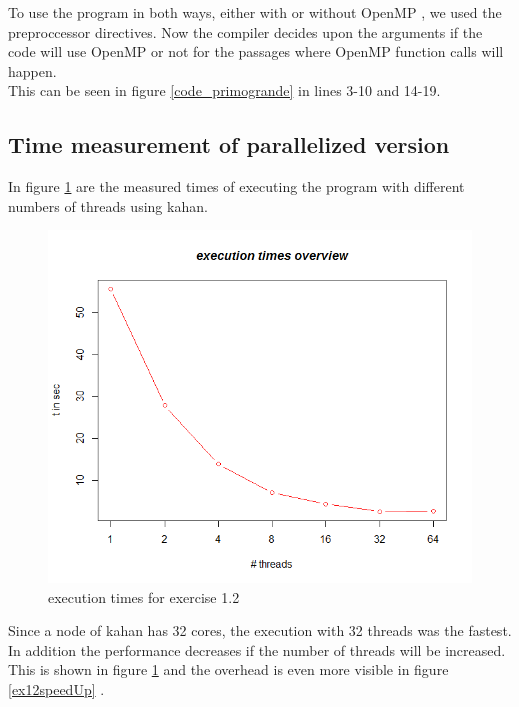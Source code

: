 \documentclass[11pt,a4paper]{article}
\begin{document}
To use the program in both ways, either with or without OpenMP , we used the preproccessor directives. Now the compiler decides upon the arguments if the code will use OpenMP or not for the passages where OpenMP function calls will happen.\\

This can be seen in figure \ref{code_primogrande} in lines 3-10 and 14-19.

\pagebreak
\subsection{Time measurement of parallelized version}

In figure \ref{ex12execution} are the measured times of executing the program with different numbers of threads using kahan.\\

\begin{figure}[h]
\centering
  \includegraphics[scale=0.35]{statistics/Ex12ResultGraph.png}
	\caption{execution times for exercise 1.2}
	\label{ex12execution}
\end{figure}


Since a node of kahan has 32 cores, the execution with 32 threads was the fastest. In addition the performance decreases if the number of threads will be increased. This is shown in figure \ref{ex12execution} and the overhead is even more visible in figure \ref{ex12speedUp} .
\end{document}
